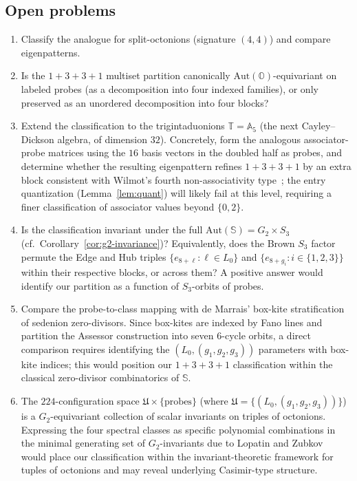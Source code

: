 \documentclass[12pt,a4paper]{article}
\begin{document}
\subsection{Open problems}\label{sec:open}
\begin{enumerate}
  \item Classify the analogue for split-octonions (signature $(4,4)$) and compare eigenpatterns.
  \item Is the $1+3+3+1$ multiset partition canonically $\mathrm{Aut}(\mathbb{O})$-equivariant on labeled probes (as a decomposition into four indexed families), or only preserved as an unordered decomposition into four blocks?
  \item Extend the classification to the trigintaduonions $\mathbb{T} = \mathbb{A}_5$ (the next Cayley--Dickson algebra, of dimension $32$). Concretely, form the analogous associator-probe matrices using the $16$ basis vectors in the doubled half as probes, and determine whether the resulting eigenpattern refines $1 + 3 + 3 + 1$ by an extra block consistent with Wilmot's fourth non-associativity type~\cite{wilmot2025structure, wilmot2025auto}; the entry quantization (Lemma~\ref{lem:quant}) will likely fail at this level, requiring a finer classification of associator values beyond $\{0, 2\}$.
  \item \label{op:autS-invariance} Is the classification invariant under the full $\mathrm{Aut}(\mathbb{S}) = G_2 \times S_3$ (cf.\ Corollary~\ref{cor:g2-invariance})? Equivalently, does the Brown $S_3$ factor~\cite{brown1967} permute the Edge and Hub triples $\{e_{8+\ell} : \ell \in L_0\}$ and $\{e_{8+g_i} : i \in \{1,2,3\}\}$ within their respective blocks, or across them? A positive answer would identify our partition as a function of $S_3$-orbits of probes.
  \item \label{op:boxkites} Compare the probe-to-class mapping with de Marrais' box-kite stratification~\cite{de_marrais2000, de_marrais2004} of sedenion zero-divisors. Since box-kites are indexed by Fano lines and partition the Assessor construction into seven 6-cycle orbits, a direct comparison requires identifying the $(L_0, (g_1, g_2, g_3))$ parameters with box-kite indices; this would position our $1+3+3+1$ classification within the classical zero-divisor combinatorics of $\mathbb{S}$.
  \item The $224$-configuration space $\mathfrak{U} \times \{\text{probes}\}$ (where $\mathfrak{U} = \{(L_0, (g_1, g_2, g_3))\}$) is a $G_2$-equivariant collection of scalar invariants on triples of octonions. Expressing the four spectral classes as specific polynomial combinations in the minimal generating set of $G_2$-invariants due to Lopatin and Zubkov~\cite{lopatin_zubkov2024} would place our classification within the invariant-theoretic framework for tuples of octonions and may reveal underlying Casimir-type structure.
\end{enumerate}
\end{document}
